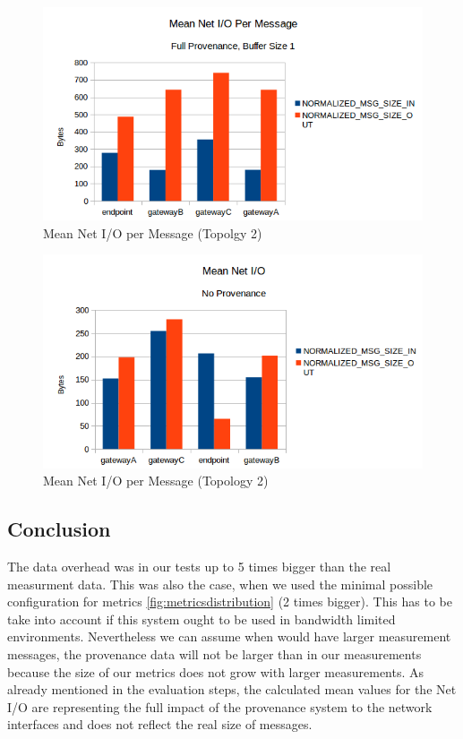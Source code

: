 \begin{figure}[H]
	\center
	\includegraphics[width=\textwidth]{figures/overheaddiagram5.png}
	\caption{Mean Net I/O per Message (Topolgy 2)}
	\label{fig:overhrad5}
\end{figure}

\begin{figure}[H]
	\center
	\includegraphics[width=\textwidth]{figures/overheaddiagram6.png}
	\caption{Mean Net I/O per Message (Topology 2)}
	\label{fig:overhead6}
\end{figure}


\subsection{Conclusion}
The data overhead was in our tests up to 5 times bigger than the real measurment data. This was also the case, when we used the minimal possible configuration for metrics \ref{fig:metricsdistribution} (2 times bigger).
This has to be take into account if this system ought to be used in bandwidth limited environments.
Nevertheless we can assume when would have larger measurement messages, the provenance data will not be larger than in our measurements because the size of our metrics does not grow with larger measurements.
As already mentioned in the evaluation steps, the calculated mean values for the Net I/O are representing the full impact of the provenance system to the network interfaces and does not reflect the real size of messages.
